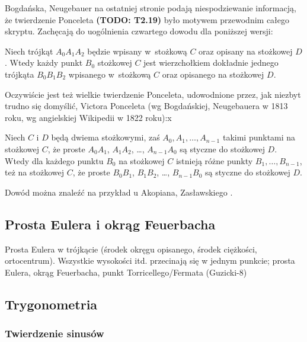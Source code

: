 
Bogdańska, Neugebauer \cite[s. 267]{neugebauer_2018} na ostatniej stronie podają niespodziewanie informacją, że twierdzenie Ponceleta {\color{red}\textbf{(TODO: T2.19)}\color{black}} było motywem przewodnim całego skryptu.
Zachęcają do uogólnienia czwartego dowodu dla poniższej wersji:

\begin{theorem}
	Niech trójkąt $A_0 A_1 A_2$ będzie wpisany w~stożkową $C$ oraz opisany na stożkowej $D$.
	Wtedy każdy punkt $B_0$ stożkowej $C$ jest wierzchołkiem dokładnie jednego trójkąta $B_0 B_1 B_2$ wpisanego w~stożkową $C$ oraz opisanego na stożkowej $D$.
\end{theorem}

Oczywiście jest też wielkie twierdzenie Ponceleta, udowodnione przez, jak niezbyt trudno się domyślić, Victora Ponceleta \cite[s. 311-317]{poncelet_1865} (wg Bogdańskiej, Neugebauera w 1813 roku, wg angielskiej Wikipedii w 1822 roku):x

\begin{theorem}
	Niech $C$ i $D$ będą dwiema stożkowymi, zaś $A_0, A_1, \ldots, A_{n-1}$ takimi punktami na stożkowej $C$, że proste $A_0A_1$, $A_1A_2$, \ldots, $A_{n-1}A_0$ są styczne do stożkowej $D$.
	Wtedy dla każdego punktu $B_0$ na stożkowej $C$ istnieją różne punkty $B_1, \ldots, B_{n-1}$, też na stożkowej $C$, że proste $B_0B_1$, $B_1B_2$, \ldots, $B_{n-1}B_0$ są styczne do stożkowej $D$.
\end{theorem}

Dowód można znaleźć na przykład u Akopiana, Zasławskiego \cite[s. 93, 61, 67, 115, 124]{akopyan_2007}.


\subsection{Prosta Eulera i okrąg Feuerbacha}
Prosta Eulera w trójkącie (środek okręgu opisanego, środek ciężkości, ortocentrum).
Wszystkie wysokości itd. przecinają się w jednym punkcie; prosta Eulera, okrąg Feuerbacha, punkt Torricellego/Fermata (Guzicki-8)


\subsection{Trygonometria}

\subsubsection{Twierdzenie sinusów}

